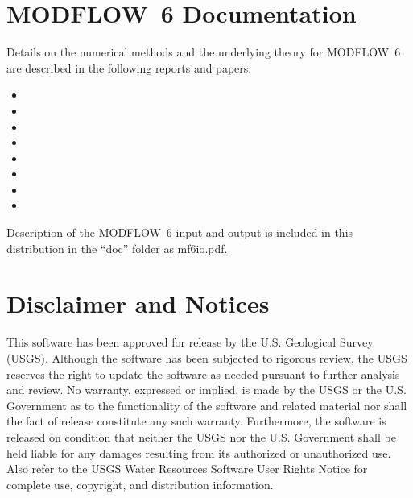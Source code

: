 \documentclass[11pt,twoside,twocolumn]{usgsreport}
\begin{document}
\section{MODFLOW~6 Documentation}
Details on the numerical methods and the underlying theory for MODFLOW~6 are described in the following reports and papers:

\begin{itemize}

\item {}

\item {}

\item {}

\item {}

\item {}

\item {}

\item {}

\item {}

\end{itemize}
 
\noindent Description of the MODFLOW~6 input and output is included in this distribution in the ``doc'' folder as mf6io.pdf.


\section{Disclaimer and Notices}

This software has been approved for release by the U.S. Geological Survey (USGS). Although the software has been subjected to rigorous review, the USGS reserves the right to update the software as needed pursuant to further analysis and review. No warranty, expressed or implied, is made by the USGS or the U.S. Government as to the functionality of the software and related material nor shall the fact of release constitute any such warranty. Furthermore, the software is released on condition that neither the USGS nor the U.S. Government shall be held liable for any damages resulting from its authorized or unauthorized use. Also refer to the USGS Water Resources Software User Rights Notice for complete use, copyright, and distribution information.
\end{document}
